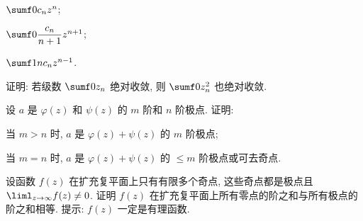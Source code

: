 \begin{homework}
\begin{subex}
\begin{subsubex}
        \item $\sumf0 c_nz^n$;
        \item $\sumf0 \dfrac{c_n}{n+1}z^{n+1}$;
        \item $\sumf1 nc_nz^{n-1}$.
      \end{subsubex}
    \item 证明: 若级数 $\sumf0 z_n$ 绝对收敛, 则 $\sumf0 z_n^2$ 也绝对收敛.
    \item 设 $a$ 是 $\varphi(z)$ 和 $\psi(z)$ 的 $m$ 阶和 $n$ 阶极点. 证明:
      \begin{subsubex}
        \item 当 $m>n$ 时, $a$ 是 $\varphi(z)+\psi(z)$ 的 $m$ 阶极点;
        \item 当 $m=n$ 时, $a$ 是 $\varphi(z)+\psi(z)$ 的 $\le m$ 阶极点或可去奇点.
      \end{subsubex}
    \item 设函数 $f(z)$ 在扩充复平面上只有有限多个奇点, 这些奇点都是极点且 $\liml_{z\ra\infty}f(z)\neq0$.
      证明 $f(z)$ 在扩充复平面上所有零点的阶之和与所有极点的阶之和相等. 提示: $f(z)$ 一定是有理函数.
  \end{subex}
\end{homework}


% 
% 
% 

% 
% 

% 




